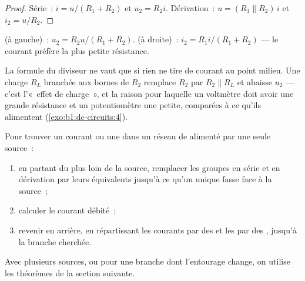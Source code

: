 \begin{proof}
Série~: $i = u/(R_1 + R_2)$ et $u_2 = R_2 i$. Dérivation~: $u = (R_1
\parallel R_2)\,i$ et $i_2 = u/R_2$.
\end{proof}

\begin{omfigure}

{\small {} (à gauche)~: $u_2 = R_2 u/(R_1 + R_2)$.
 (à droite)~: $i_2 = R_1 i/(R_1 + R_2)$ --- le
courant préfère la plus petite résistance.}
\end{omfigure}

\begin{remark}\label{rem:b1:dc-circuits:loading}
La formule du diviseur ne vaut que si rien ne tire de courant au point
milieu. Une charge $R_L$ branchée aux bornes de $R_2$ remplace $R_2$ par $R_2
\parallel R_L$ et abaisse $u_2$ --- c'est l'«~effet de charge~», et la
raison pour laquelle un voltmètre doit avoir une grande résistance et un
potentiomètre une petite, comparées à ce qu'ils alimentent
(\cref{exo:b1:dc-circuits:4}).
\end{remark}

\begin{method}\label{met:b1:dc-circuits:reduce}
Pour trouver un courant ou une  dans un réseau de  alimenté par une seule source~:
\begin{enumerate}
  \item en partant du plus loin de la source, remplacer les groupes en
        série et en dérivation par leurs équivalents jusqu'à ce qu'un
         unique fasse face à la source~;
  \item calculer le courant débité~;
  \item revenir en arrière, en répartissant les courants par des
         et les  par des , jusqu'à la branche cherchée.
\end{enumerate}
Avec plusieurs sources, ou pour une branche dont l'entourage change, on
utilise les théorèmes de la section suivante.
\end{method}

